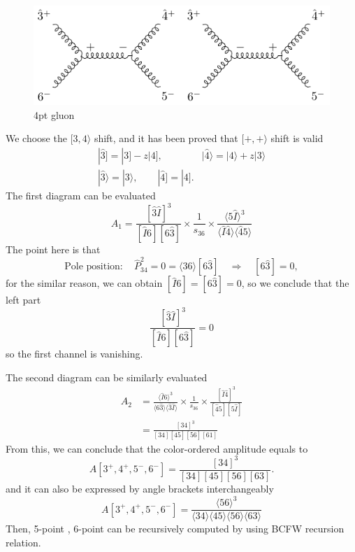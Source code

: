 \documentclass[12pt]{article}
\newcommand{\mdavg}[2]{\langle #1 \rangle\!\langle #2 \rangle}
\newcommand{\avg}[1]{\langle #1 \rangle}
\newcommand{\aket}[1]{|#1\rangle}
\newcommand{\sket}[1]{|#1]}
\begin{document}
\begin{figure}[H]
    \centering
    \includegraphics{4ptg.pdf}
    \caption*{4pt gluon}
\end{figure}
We choose the $[3,4\rangle$ shift, and it has been proved that $[+,+\rangle$ shift is valid
\begin{gather*}
    \sket{\hat{3}}=\sket{3}-z\sket{4},\qquad \qquad \aket{\hat{4}}=\aket{4}+z\aket{3}\\
    \aket{\hat{3}}=\aket{3}, \qquad \sket{\hat{4}}=\sket{4}.
\end{gather*}
The first diagram can be evaluated 
\begin{equation*}
    A_1=\frac{[\hat{3}\hat{I}]^3}{[\hat{I}6][6\hat{3}]}\times\frac{1}{s_{36}}\times\frac{\avg{5\hat{I}}^3}{\mdavg{\hat{I}\hat{4}}{\hat{4}5}}
\end{equation*}
The point here is that 
\begin{equation*}
    \text{Pole position}:\quad \hat{P}_{34}^2=0=\avg{36}[6\hat{3}]\quad \Rightarrow  \quad [6\hat{3}]=0,
\end{equation*}
for the similar reason, we can obtain $[\hat{I}6]=[6\hat{3}]=0$, so we conclude that the left part
\begin{equation*}
    \frac{[\hat{3}\hat{I}]^3}{[\hat{I}6][6\hat{3}]}=0
\end{equation*}
so the first channel is vanishing.

The second diagram can be similarly evaluated
\begin{align*}
    A_2&=\frac{\avg{\hat{I}6}^3}{\mdavg{6\hat{3}}{\hat{3}\hat{I}}}\times\frac{1}{s_{36}}\times\frac{[\hat{I}\hat{4}]^3}{[\hat{4}5][5\hat{I}]}\\
       &=\frac{[34]^3}{[34][45][56][61]}
\end{align*}
From this, we can conclude that the color-ordered amplitude equals to
\begin{equation*}
    A[3^+,4^+,5^-,6^-]=\frac{[34]^3}{[34][45][56][63]}.
\end{equation*}
and it can also be expressed by angle brackets interchangeably
\begin{equation*}
    A[3^+,4^+,5^-,6^-]=\frac{\avg{56}^3}{\mdavg{34}{45}\!\mdavg{56}{63}}
\end{equation*}
Then, 5-point , 6-point can be recursively computed by using BCFW recursion relation. 
\end{document}
